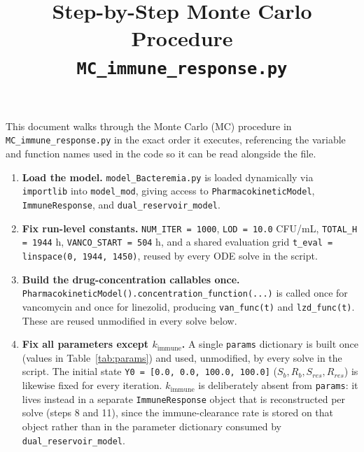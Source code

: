\documentclass[11pt]{article}
\title{Step-by-Step Monte Carlo Procedure\\
\large \texttt{MC\_immune\_response.py}}
\author{}
\date{}
\begin{document}
\maketitle

\noindent This document walks through the Monte Carlo (MC) procedure in
\texttt{MC\_immune\_response.py} in the exact order it executes, referencing
the variable and function names used in the code so it can be read alongside
the file.

\begin{enumerate}

\item \textbf{Load the model.} \texttt{model\_Bacteremia.py} is loaded
dynamically via \texttt{importlib} into \texttt{model\_mod}, giving access
to \texttt{PharmacokineticModel}, \texttt{ImmuneResponse}, and
\texttt{dual\_reservoir\_model}.

\item \textbf{Fix run-level constants.} \texttt{NUM\_ITER = 1000},
\texttt{LOD = 10.0} CFU/mL, \texttt{TOTAL\_H = 1944} h,
\texttt{VANCO\_START = 504} h, and a shared evaluation grid
\texttt{t\_eval = linspace(0, 1944, 1450)}, reused by every ODE solve in the
script.

\item \textbf{Build the drug-concentration callables once.}
\texttt{PharmacokineticModel().concentration\_function(...)} is called once
for vancomycin and once for linezolid, producing \texttt{van\_func(t)} and
\texttt{lzd\_func(t)}. These are reused unmodified in every solve below.

\item \textbf{Fix all parameters except $k_{\mathrm{immune}}$.} A single
\texttt{params} dictionary is built once (values in Table~\ref{tab:params})
and used, unmodified, by every solve in the script. The initial state
\texttt{Y0 = [0.0, 0.0, 100.0, 100.0]} ($S_b, R_b, S_{res}, R_{res}$) is
likewise fixed for every iteration. $k_{\mathrm{immune}}$ is deliberately
absent from \texttt{params}: it lives instead in a separate
\texttt{ImmuneResponse} object that is reconstructed per solve (steps 8 and
11), since the immune-clearance rate is stored on that object rather than
in the parameter dictionary consumed by \texttt{dual\_reservoir\_model}.


\end{enumerate}
\end{document}

